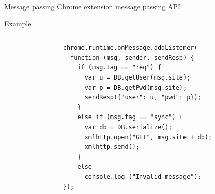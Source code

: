 \documentclass[11pt]{beamer}
\begin{document}
\begin{frame}{Message passing}
Chrome extension message passing API
\end{frame}

\begin{frame}[fragile]{Example}
\begin{columns}[T]
\begin{column}{.48\textwidth}

\end{column}
\begin{column}{.48\textwidth}
\begin{tiny}
\begin{lstlisting}
chrome.runtime.onMessage.addListener(
  function (msg, sender, sendResp) {
    if (msg.tag == "req") {
      var u = DB.getUser(msg.site);
      var p = DB.getPwd(msg.site);
      sendResp({"user": u, "pwd": p});
    }
    else if (msg.tag == "sync") {
      var db = DB.serialize();
      xmlhttp.open("GET", msg.site + db);
      xmlhttp.send();
    }
    else
      console.log ("Invalid message");
});
\end{lstlisting}
\end{tiny}
\end{column}
\end{columns}
\end{frame}
\end{document}
